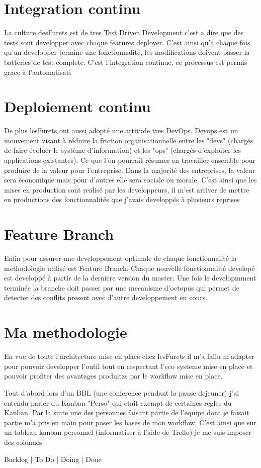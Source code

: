 \section{Integration continu}
La culture desFurets est de tres Test Driven Development c'est a dire que des tests sont developper avec chaque features deployer. C'est ainsi qu'a chaque fois qu'un developper termine une fonctionnalité, les modifications doivent passer la batteries de test complete. C'est l'integration continue, ce processus est permis grace à l'automatisati

\section{Deploiement continu}
De plus lesFurets ont aussi adopté une attitude tres DevOps. Devops est un mouvement visant à réduire la friction organisationnelle entre les "devs" (chargés de faire évoluer le système d'information) et les "ops" (chargés d'exploiter les applications existantes).
Ce que l'on pourrait résumer en travailler ensemble pour produire de la valeur pour l'entreprise. Dans la majorité des entreprises, la valeur sera économique mais pour d'autres elle sera sociale ou morale. C'est ainsi que les mises en production sont realisé par les developpeurs, il m'est arriver de mettre en productions des fonctionnalités que j'avais developpés à plusieurs reprises

\section{Feature Branch}
Enfin pour assurer une developpement optimale de chaque fonctionnalité la methodologie utilisé est Feature Branch. Chaque nouvelle fonctionnalité developé est developpé à partir de la derniere version du master. Une fois le developmment terminée la branche doit passer par une mecanisme d'octopus qui permet de detecter des conflits present avec d'autre developpement en cours. 

\section{Ma methodologie}
En vue de toute l'architecture mise en place chez lesFurets il m'a fallu m'adapter pour pouvoir developper l'outil tout en respectant l'eco systeme mise en place et pouvoir profiter des avantages produitzs par le workflow mise en place.

Tout d'abord lors d'un BBL (une conference pendant la pause dejeuner) j'ai entendu parler du Kanban "Perso" qui etait exempt de certaines regles du Kanban. Par la suite une des personnes faisant partie de l'equipe dont je faisait partie m'a pris en main pour poser les bases de mon workflow. C'est ainsi que sur un tableau kanban personnel (informatiser à l'aide de Trello) je me suis imposer des colonnes 
\begin{center}Backlog | To Do | Doing | Done\end{center}
